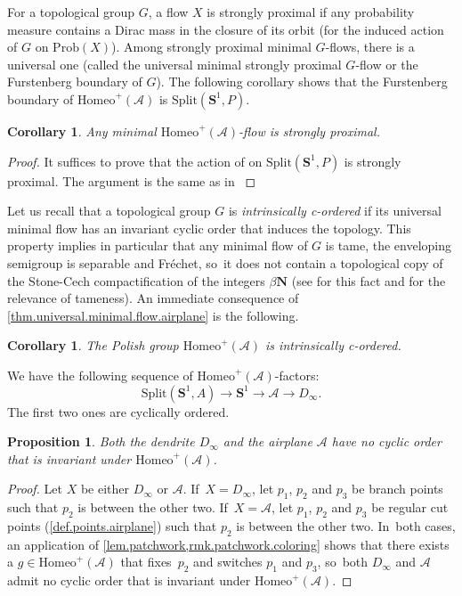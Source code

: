 \documentclass[JEP,XML,SOM,Unicode,NoFloatCountersInSection,published]{cedram}
\theoremstyle{plain}
\newtheorem{corollary}[theorem]{Corollary}
\newtheorem{proposition}[theorem]{Proposition}
\theoremstyle{definition}
\theoremstyle{remark}
\newcommand{\Homeo}{\mathrm{Homeo}}
\newcommand{\Split}{\mathrm{Split}}
\newcommand{\Prob}{\mathrm{Prob}}
\newcommand{\A}{\mathcal{A}}
\begin{document}
For a topological group $G$, a flow $X$ is strongly proximal if any probability measure contains a Dirac mass in the closure of its orbit (for the induced action of $G$ on $\Prob(X)$).
Among strongly proximal minimal $G$-flows, there is a universal one (called the universal minimal strongly proximal $G$-flow or the Furstenberg boundary of $G$).
The following corollary shows that the Furstenberg boundary of $\Homeo^+(\A)$ is $\Split(\mathbf{S}^1,P)$.

\begin{corollary}
Any minimal $\Homeo^+(\A)$-flow is strongly proximal.
\end{corollary}

\begin{proof}
It suffices to prove that the action of on $\Split(\mathbf{S}^1,P)$ is strongly proximal. The argument is the same as in \cite[Cor.\,5.1.]{KaleidoscopicOnCircle}
\end{proof}

Let us recall that a topological group $G$ is \emph{intrinsically c-ordered} if its universal minimal flow has an invariant cyclic order that induces the topology.
This property implies in particular that any minimal flow of $G$ is tame, \ie the enveloping semigroup is separable and Fréchet, so~it does not contain a topological copy of the Stone-Cech compactification of the integers $\beta\mathbf{N}$ (see \cite{Glasner-Megrelishvili-2018} for this fact and \cite{Glasner,MoreTameDynSys} for the relevance of tameness).
An immediate consequence of \cref{thm.universal.minimal.flow.airplane} is the following.

\begin{corollary}
\label{cor.c.ordered}
The Polish group $\Homeo^+(\A)$ is intrinsically c-ordered.
\end{corollary}

We have the following sequence of $\Homeo^+(\A)$-factors:
\[
 \Split(\mathbf{S}^1,A)\to\mathbf{S}^1\to\A\to D_\infty. 
\]
The first two ones are cyclically ordered.

\begin{proposition}
\label{prop.no.invariant.cyclic.order}
Both the dendrite $D_\infty$ and the airplane $\A$ have no cyclic order that is invariant under $\Homeo^+(\A)$.
\end{proposition}

\begin{proof}
Let $X$ be either $D_\infty$ or $\A$. If~$X=D_\infty$, let $p_1$, $p_2$ and $p_3$ be branch points such that $p_2$ is between the other two. If~$X=\A$, let $p_1$, $p_2$ and $p_3$ be regular cut points (\cref{def.points.airplane}) such that $p_2$ is between the other two. In~both cases, an application of \cref{lem.patchwork,rmk.patchwork.coloring} shows that there exists a $g \in \Homeo^+(\A)$ that fixes~$p_2$ and switches $p_1$ and $p_3$, so~both $D_\infty$ and $\A$ admit no cyclic order that is invariant under $\Homeo^+(\A)$.
\end{proof}
\end{document}
